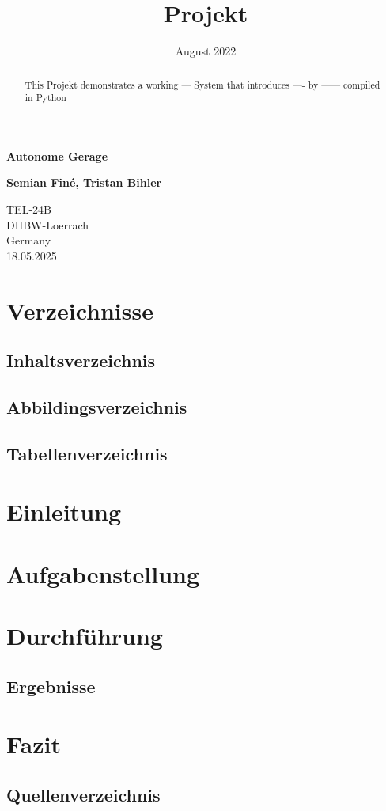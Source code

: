 \documentclass{report}
\title{}
\author{{}}
\date{August 2022}
\begin{document}
\begin{abstract}
This Projekt demonstrates a working --- 
System that introduces ---- by ------ compiled in Python
\end{abstract}

\begin{center}
    \vspace*{1cm}

    \Huge\textbf{Autonome Gerage}

    \vspace{0.5cm}
    \title{Projekt} 
        
    \vspace{1.5cm}

    \small\textbf{Semian Finé, Tristan Bihler}

    \vfill
        
    \vspace{0.8cm}
                
    \Large TEL-24B\\
    DHBW-Loerrach\\
    Germany\\
    18.05.2025
        
\end{center}

\chapter{Verzeichnisse}
\section{Inhaltsverzeichnis}

\section{Abbildingsverzeichnis}

\section{Tabellenverzeichnis}


\chapter{Einleitung}

\chapter{Aufgabenstellung}

\chapter{Durchführung}

\section{Ergebnisse}

\chapter{Fazit}

\section{Quellenverzeichnis}
\end{document}
